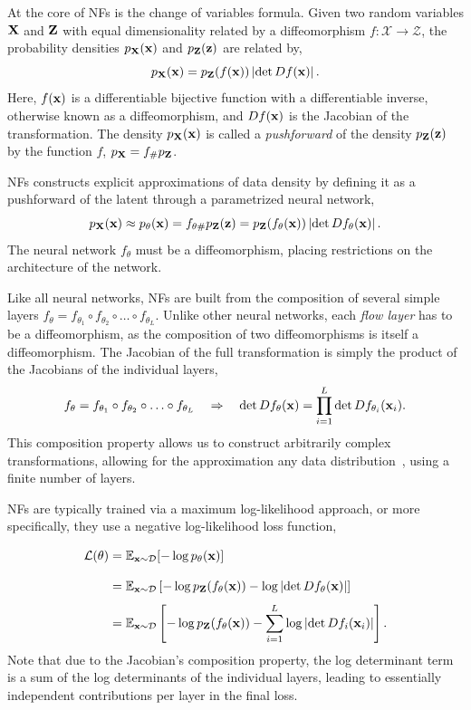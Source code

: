 At the core of NFs is the change of variables formula.
Given two random variables $\mathbf{X}$ and $\mathbf{Z}$ with equal dimensionality related by a diffeomorphism $f: \mathcal{X} \rightarrow \mathcal{Z}$, the probability densities $p_{\mathbf{X}}(\mathbf{x})$ and $p_{\mathbf{Z}}(\mathbf{z})$ are related by,
\begin{equation}
    \label{eq:change_of_variables}
    p_{\mathbf{X}}(\mathbf{x}) = p_{\mathbf{Z}}(f(\mathbf{x})) \left|\det D f(\mathbf{x}) \right|.
\end{equation}
Here, $f(\mathbf{x})$ is a differentiable bijective function with a differentiable inverse, otherwise known as a diffeomorphism, and $D f(\mathbf{x})$ is the Jacobian of the transformation.
The density $p_{\mathbf{X}}(\mathbf{x})$ is called a \textit{pushforward} of the density $p_{\mathbf{Z}}(\mathbf{z})$ by the function $f$, $p_{\mathbf{X}} = f_\# p_{\mathbf{Z}}$.

NFs constructs explicit approximations of data density by defining it as a pushforward of the latent through a parametrized neural network,
\begin{equation}
    p_{\mathbf{X}}(\mathbf{x}) \approx p_{\theta}(\mathbf{x}) = f_{\theta \#} p_{\mathbf{Z}}(\mathbf{z}) = p_{\mathbf{Z}}(f_{\theta}(\mathbf{x})) \left|\det D f_{\theta}(\mathbf{x}) \right|.
\end{equation}
The neural network $f_{\theta}$ must be a diffeomorphism, placing restrictions on the architecture of the network.

Like all neural networks, NFs are built from the composition of several simple layers $f_\theta = f_{\theta_1} \circ f_{\theta_2} \circ \ldots \circ f_{\theta_L}$.
Unlike other neural networks, each \textit{flow layer} has to be a diffeomorphism, as the composition of two diffeomorphisms is itself a diffeomorphism.
The Jacobian of the full transformation is simply the product of the Jacobians of the individual layers,
\begin{equation}
    f_\theta = f_{\theta_1} \circ f_{\theta_2} \circ \ldots \circ f_{\theta_L} \quad \Rightarrow \quad \det D f_\theta(\mathbf{x}) = \prod_{i=1}^L \det D f_{\theta_i}(\mathbf{x}_i).
\end{equation}
This composition property allows us to construct arbitrarily complex transformations, allowing for the approximation any data distribution~\cite{bogachev2005triangular}, using a finite number of layers.

NFs are typically trained via a maximum log-likelihood approach, or more specifically, they use a negative log-likelihood loss function,
\begin{equation}
    \label{eq:nf_loss}
    \begin{aligned}
        \mathcal{L}(\theta)
        \frach &= \mathbb{E}_{\x \sim \mathcal{D}}[-\log p_{\theta}(\x)] \\
        \frach &= \mathbb{E}_{\x \sim \mathcal{D}}\left[-\log p_{\Z}(f_{\theta}(\x)) - \log \left|\det D f_{\theta}(\x) \right|\right] \\
        \frach &= \mathbb{E}_{\x \sim \mathcal{D}}\left[-\log p_{\Z}(f_{\theta}(\x)) - \sum_{i=1}^L \log \left|\det D f_i(\x_i) \right|\right].
    \end{aligned}
\end{equation}
Note that due to the Jacobian's composition property, the log determinant term is a sum of the log determinants of the individual layers, leading to essentially independent contributions per layer in the final loss.

